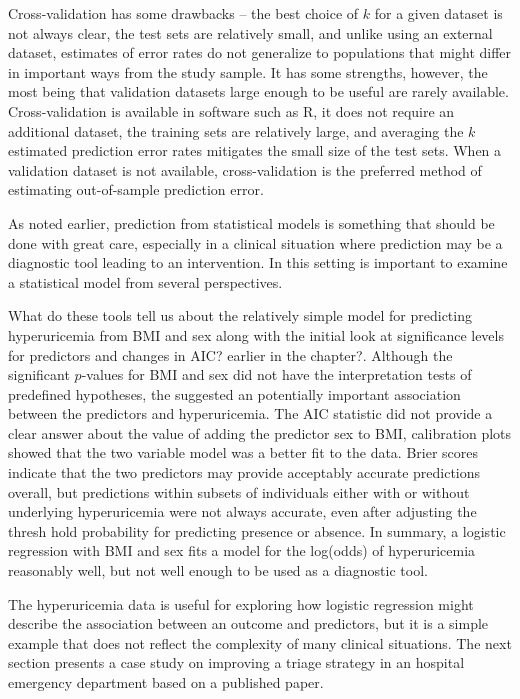 Cross-validation has some drawbacks -- the best choice of $k$ for a given dataset is not always clear, the test sets are relatively small, and unlike using an external dataset, estimates of error rates do not generalize to populations that might differ in  important ways from the study sample.  It has some strengths, however, the most being that validation datasets large enough to be useful are rarely available.  Cross-validation is available in software such as \textsf{R}, it does not require an additional dataset, the training sets are relatively large, and averaging the $k$ estimated prediction error rates mitigates the small size of the test sets.  When a validation dataset is not available, cross-validation is the preferred method of estimating out-of-sample prediction error.

As noted earlier, prediction from statistical models is something that should be done with great care, especially in a clinical situation where prediction may be a diagnostic tool leading to an intervention.  In this setting is important to examine a statistical model from several perspectives.  

What do these tools tell us about the relatively simple model for predicting hyperuricemia from BMI and sex along with the initial look at significance levels for predictors and changes in AIC? earlier in the chapter?.  Although the significant $p$-values for BMI and sex did not have the interpretation tests of predefined hypotheses, the suggested an potentially important association between the predictors and hyperuricemia.  The AIC statistic did not provide a clear answer about the value of adding the predictor sex to BMI, calibration plots showed that the two variable model was a better fit to the data.  Brier scores indicate that the two predictors may provide acceptably accurate predictions overall, but predictions within subsets of individuals either with or without underlying hyperuricemia were not always accurate, even after adjusting the thresh hold probability for predicting presence or absence.  In summary, a logistic regression with BMI and sex fits a model for the log(odds) of hyperuricemia reasonably well, but not well enough to be used as a diagnostic tool.

The hyperuricemia data is useful for exploring how logistic regression might describe the association between an outcome and predictors, but it is a simple example that does not reflect the complexity of many clinical situations.  The next section presents a case study on improving a triage strategy in an hospital emergency department based on a published paper.


